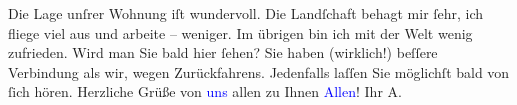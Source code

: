                Die Lage unſrer Wohnung iſt wundervoll. Die Landſchaft behagt mir ſehr, ich fliege
               viel aus und arbeite – weniger. Im übrigen bin ich mit der Welt wenig zufrieden. Wird
               man Sie bald hier ſehen? Sie haben (wirklich!) beſſere Verbindung als wir, wegen
               Zurückfahrens. Jedenfalls laſſen Sie möglichſt bald von ſich hören. Herzliche Grüße
               von \textcolor{blue}{uns}{} allen zu
               Ihnen \textcolor{blue}{Allen}{}! \pend
           \pstart Ihr \spacefill\mbox{A.}\pend{}\endnumbering{}  
      